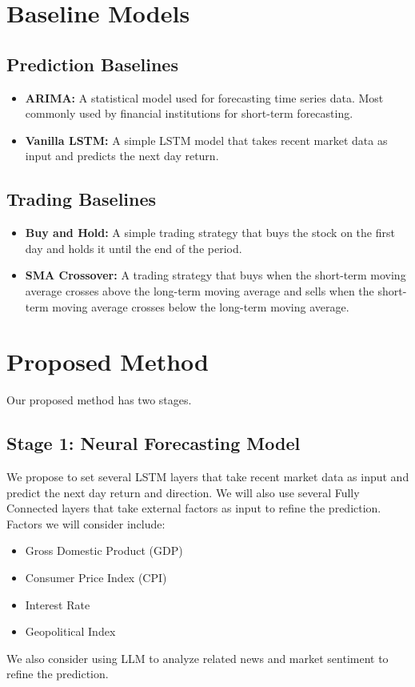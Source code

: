 \documentclass[12pt, a4paper]{article}
\begin{document}
\section{Baseline Models}

\subsection{Prediction Baselines}
\begin{itemize}
    \item \textbf{ARIMA:} A statistical model used for forecasting time series data. Most commonly used by financial institutions for short-term forecasting.
    \item \textbf{Vanilla LSTM:} A simple LSTM model that takes recent market data as input and predicts the next day return.
\end{itemize}
\subsection{Trading Baselines}
\begin{itemize}
    \item \textbf{Buy and Hold:} A simple trading strategy that buys the stock on the first day and holds it until the end of the period.
    \item \textbf{SMA Crossover:} A trading strategy that buys when the short-term moving average crosses above the long-term moving average and sells when the short-term moving average crosses below the long-term moving average.
\end{itemize}

\section{Proposed Method}
Our proposed method has two stages.

\subsection{Stage 1: Neural Forecasting Model}

We propose to set several LSTM layers that take recent market data as input and predict the next day return and direction. We will also use several Fully Connected layers that take external factors as input to refine the prediction.
Factors we will consider include:
\begin{itemize}
    \item Gross Domestic Product (GDP)
    \item Consumer Price Index (CPI)
    \item Interest Rate
    \item Geopolitical Index
\end{itemize}
We also consider using LLM to analyze related news and market sentiment to refine the prediction.
\end{document}
